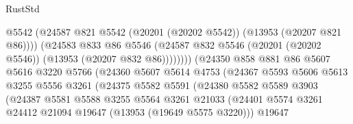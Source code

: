 \begin{lexlean}{RustStd}
\begin{coremodule}
                                        @5542
                                        (@24587
                                          @821
                                          @5542
                                          (@20201 (@20202 @5542))
                                          (@13953 (@20207 @821 @86))))
                                      (@24583
                                        @833
                                        @86
                                        @5546
                                        (@24587
                                          @832
                                          @5546
                                          (@20201 (@20202 @5546))
                                          (@13953 (@20207 @832 @86))))))))
                              (@24350
                                @858
                                @881
                                @86
                                @5607
                                @5616
                                @3220
                                @5766
                                (@24360
                                  @5607
                                  @5614
                                  @4753
                                  (@24367
                                    @5593
                                    @5606
                                    @5613
                                    @3255
                                    @5556
                                    @3261
                                    (@24375
                                      @5582
                                      @5591
                                      (@24380
                                        @5582
                                        @5589
                                        @3903
                                        (@24387
                                          @5581
                                          @5588
                                          @3255
                                          @5564
                                          @3261
                                          @21033
                                          (@24401
                                            @5574
                                            @3261
                                            @24412
                                            @21094
                                            @19647
                                            (@13953 (@19649 @5575 @3220)))
                                          @19647

\end{coremodule}
\end{lexlean}

